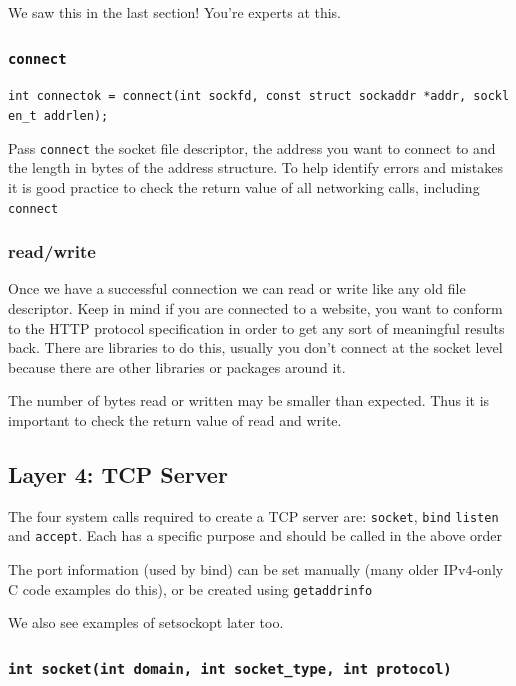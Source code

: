 \documentclass[]{article}
\begin{document}
We saw this in the last section! You're experts at this.

\subsubsection{\texorpdfstring{\texttt{connect}}{connect}}\label{connect}

\texttt{int\ connectok\ =\ connect(int\ sockfd,\ const\ struct\ sockaddr\ *addr,\ socklen\_t\ addrlen);}

Pass \texttt{connect} the socket file descriptor, the address you want
to connect to and the length in bytes of the address structure. To help
identify errors and mistakes it is good practice to check the return
value of all networking calls, including \texttt{connect}

\subsubsection{read/write}\label{readwrite}

Once we have a successful connection we can read or write like any old
file descriptor. Keep in mind if you are connected to a website, you
want to conform to the HTTP protocol specification in order to get any
sort of meaningful results back. There are libraries to do this, usually
you don't connect at the socket level because there are other libraries
or packages around it.

The number of bytes read or written may be smaller than expected. Thus
it is important to check the return value of read and write.

\subsection{Layer 4: TCP Server}\label{layer-4-tcp-server}

The four system calls required to create a TCP server are:
\texttt{socket}, \texttt{bind} \texttt{listen} and \texttt{accept}. Each
has a specific purpose and should be called in the above order

The port information (used by bind) can be set manually (many older
IPv4-only C code examples do this), or be created using
\texttt{getaddrinfo}

We also see examples of setsockopt later too.

\subsubsection{\texorpdfstring{\texttt{int\ socket(int\ domain,\ int\ socket\_type,\ int\ protocol)}}{int socket(int domain, int socket\_type, int protocol)}}\label{int-socketint-domain-int-socketux5ftype-int-protocol}
\end{document}
